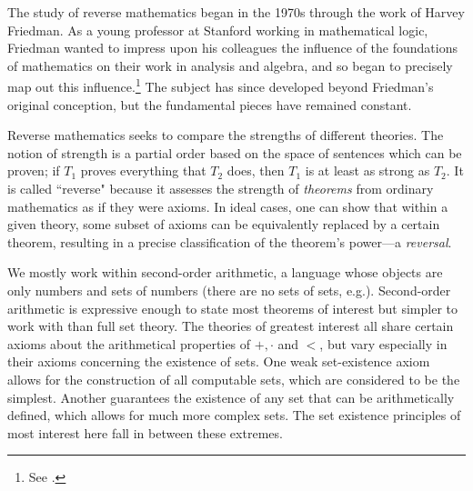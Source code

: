 \documentclass{amsart}
\begin{document}
{		The study of reverse mathematics began in the 1970s through the work of Harvey Friedman. As a young professor at Stanford working in mathematical logic, Friedman wanted to impress upon his colleagues the influence of the foundations of mathematics on their work in analysis and algebra, and so began to precisely map out this influence.\footnote{See \cite{friedman}.} The subject has since developed beyond Friedman's original conception, but the fundamental pieces have remained constant. 
		
		
		Reverse mathematics seeks to compare the strengths of different theories. The notion of strength is a partial order based on the space of sentences which can be proven; if $T_1$ proves everything that $T_2$ does, then $T_1$ is at least as strong as $T_2$. It is called ``reverse" because it assesses the strength of \textit{theorems} from ordinary mathematics as if they were axioms. In ideal cases, one can show that within a given theory, some subset of axioms can be equivalently replaced by a certain theorem, resulting in a precise classification of the theorem's power---a \textit{reversal}.
		
		We mostly work within second-order arithmetic, a language whose objects are only numbers and sets of numbers (there are no sets of sets, e.g.). Second-order arithmetic is expressive enough to state most theorems of interest but simpler to work with than full set theory. The theories of greatest interest all share certain axioms about the arithmetical properties of $+,\cdot$ and $<$, but vary especially in their axioms concerning the existence of sets. One weak set-existence axiom allows for the construction of all computable sets, which are considered to be the simplest. Another guarantees the existence of any set that can be arithmetically defined, which allows for much more complex sets. The set existence principles of most interest here fall in between these extremes. \\
		
		
}
\end{document}

